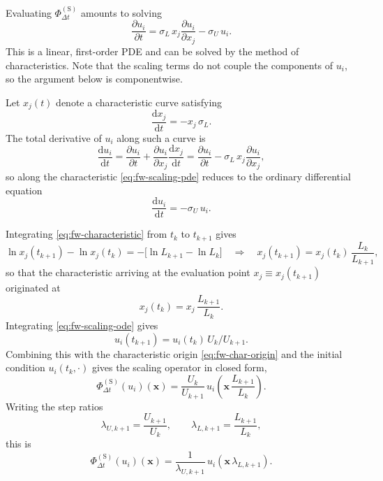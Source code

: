 \documentclass{article}
\begin{document}
Evaluating $\Phi_{\Delta t}^{(\mathrm{S})}$ amounts to solving
\begin{equation}\label{eq:fw-scaling-pde}
  \frac{\partial u_i}{\partial t}
  = \sigma_L\, x_j \frac{\partial u_i}{\partial x_j} - \sigma_U\, u_i .
\end{equation}
This is a linear, first-order PDE and can be solved by the method of
characteristics. Note that the scaling terms do not couple the components of
$u_i$, so the argument below is componentwise.

Let $x_j(t)$ denote a characteristic curve satisfying
\begin{equation}\label{eq:fw-characteristic}
  \frac{\mathrm{d} x_j}{\mathrm{d} t} = -x_j\, \sigma_L.
\end{equation}
 The total derivative of $u_i$ along such a
curve is
\begin{equation}\label{eq:fw-total-derivative}
  \frac{\mathrm{d} u_i}{\mathrm{d} t}
  = \frac{\partial u_i}{\partial t} + \frac{\partial u_i}{\partial x_j} \frac{\mathrm{d} x_j}{\mathrm{d} t}
  = \frac{\partial u_i}{\partial t} - \sigma_L\, x_j \frac{\partial u_i}{\partial x_j},
\end{equation}
so along the characteristic \eqref{eq:fw-scaling-pde} reduces to the ordinary
differential equation
\begin{equation}\label{eq:fw-scaling-ode}
  \frac{\mathrm{d} u_i}{\mathrm{d} t} = -\sigma_U\, u_i .
\end{equation}

Integrating \eqref{eq:fw-characteristic} from $t_k$ to $t_{k+1}$ gives
\begin{equation}\label{eq:fw-char-integrated}
  \ln x_j(t_{k+1}) - \ln x_j(t_k) = -\bigl[\ln L_{k+1} - \ln L_k\bigr]
  \quad\Longrightarrow\quad
  x_j(t_{k+1}) = x_j(t_k)\, \frac{L_k}{L_{k+1}},
\end{equation}
so that the characteristic arriving at the evaluation point
$x_j \equiv x_j(t_{k+1})$ originated at
\begin{equation}\label{eq:fw-char-origin}
  x_j(t_k) = x_j\, \frac{L_{k+1}}{L_k} .
\end{equation}
Integrating \eqref{eq:fw-scaling-ode} gives
\begin{equation}
  u_i(t_{k+1}) = u_i(t_k)\, U_k / U_{k+1}.
\end{equation}
Combining this with the characteristic origin \eqref{eq:fw-char-origin} and the initial condition
$u_i(t_k, \cdot)$ gives the scaling operator in closed form,
\begin{equation}\label{eq:fw-scaling-closed}
  \Phi_{\Delta t}^{(\mathrm{S})}(u_i)(\mathbf{x})
  = \frac{U_k}{U_{k+1}}\, u_i\!\left( \mathbf{x}\, \frac{L_{k+1}}{L_k} \right).
\end{equation}
Writing the step ratios
\begin{equation}\label{eq:fw-step-ratios}
  \lambda_{U,k+1} = \frac{U_{k+1}}{U_k}, \qquad
  \lambda_{L,k+1} = \frac{L_{k+1}}{L_k},
\end{equation}
this is
\begin{equation}\label{eq:fw-scale-step}
  \Phi_{\Delta t}^{(\mathrm{S})}(u_i)(\mathbf{x})
  = \frac{1}{\lambda_{U,k+1}}\, u_i\!\left( \mathbf{x}\, \lambda_{L,k+1} \right).
\end{equation}
\end{document}
